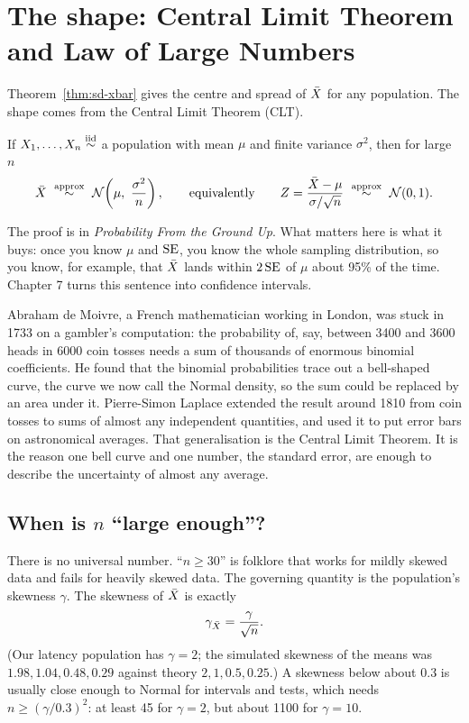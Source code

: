 \section{The shape: Central Limit Theorem and Law of Large Numbers}
\label{sec:sd-clt}

Theorem~\ref{thm:sd-xbar} gives the centre and spread of $\bar{X}$ for any
population. The shape comes from the Central Limit Theorem (CLT).

\begin{theorem}
\label{thm:sd-clt}
If $X_1,\dots,X_n\overset{\text{iid}}{\sim}$ a population with mean $\mu$ and finite variance
$\sigma^2$, then for large $n$
\[
\Xbar\ \overset{\text{approx}}{\sim}\ \Normal\!\left(\mu,\ \frac{\sigma^2}{n}\right),
\qquad\text{equivalently}\qquad
Z=\frac{\Xbar-\mu}{\sigma/\sqrt n}\ \overset{\text{approx}}{\sim}\ \Normal(0,1).
\]
\end{theorem}

The proof is in \emph{Probability From the Ground Up}. What matters here is what it
buys: once you know $\mu$ and $\operatorname{SE}$, you know the whole sampling distribution, so
you know, for example, that $\bar{X}$ lands within $2\operatorname{SE}$ of $\mu$ about 95\% of the
time. Chapter 7 turns this sentence into confidence intervals.

\begin{historybox}
Abraham de Moivre, a French mathematician working in London, was stuck in 1733 on
a gambler's computation: the probability of, say, between 3400 and 3600 heads in
6000 coin tosses needs a sum of thousands of enormous binomial coefficients. He
found that the binomial probabilities trace out a bell-shaped curve, the curve we
now call the Normal density, so the sum could be replaced by an area under it.
Pierre-Simon Laplace extended the result around 1810 from coin tosses to sums of
almost any independent quantities, and used it to put error bars on astronomical
averages. That generalisation is the Central Limit Theorem. It is the reason one
bell curve and one number, the standard error, are enough to describe the
uncertainty of almost any average.
\end{historybox}

\subsection{When is $n$ ``large enough''?}

There is no universal number. ``$n\ge 30$'' is folklore that works for mildly
skewed data and fails for heavily skewed data. The governing quantity is the
population's skewness $\gamma$. The skewness of $\bar{X}$ is exactly
\[
\gamma_{\bar{X}}=\frac{\gamma}{\sqrt n}.
\]
(Our latency population has $\gamma=2$; the simulated skewness of the means was
$1.98, 1.04, 0.48, 0.29$ against theory $2, 1, 0.5, 0.25$.) A skewness below about
$0.3$ is usually close enough to Normal for intervals and tests, which needs
$n\ge(\gamma/0.3)^2$: at least 45 for $\gamma=2$, but about 1100 for $\gamma=10$.

